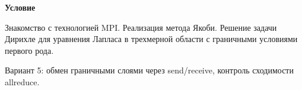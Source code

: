 \textbf{\large Условие}

Знакомство с технологией MPI. Реализация метода Якоби. Решение задачи Дирихле для уравнения Лапласа в трехмерной области с граничными условиями первого рода.

Вариант 5: обмен граничными слоями через send/receive, контроль сходимости allreduce.

